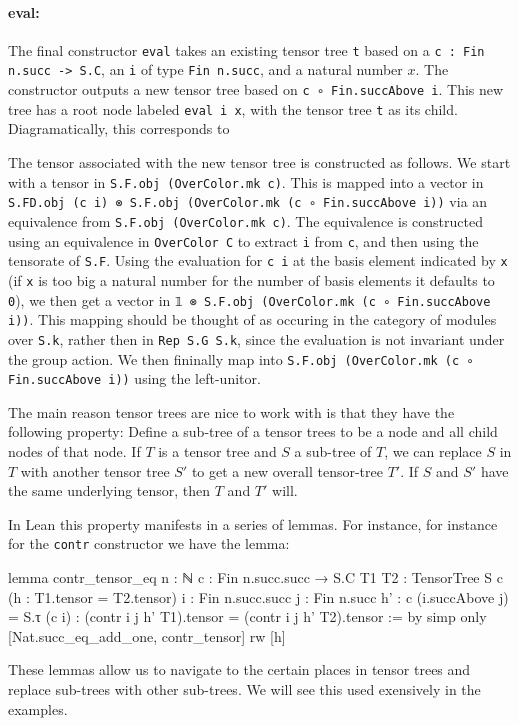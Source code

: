 \documentclass[a4paper, 11pt]{article}
\newcommand{\tensorTree}[1]{
\begin{center}
  \fcolorbox{mycolor}{white}{%
#1}
\end{center}
}
\begin{document}
\paragraph{eval:}
The final constructor \lstinline|eval| takes an existing tensor tree \lstinline|t| based on a \lstinline|c : Fin n.succ -> S.C|,
an \lstinline|i| of type \lstinline|Fin n.succ|, and a natural number $x$.  
The constructor outputs a new tensor tree based on \lstinline|c ∘ Fin.succAbove i|.
This new tree has a root node labeled \lstinline|eval i x|, with the tensor tree \lstinline|t| as its child.
Diagramatically, this corresponds to 
\tensorTree{
  \begin{tikzpicture}
    \node[draw=black] (A) at (0,0) {\lstinline|eval i x|};
    \node (B) at (0,-1) {\lstinline|t|};
    \draw[->] (A) -- (B);
  \end{tikzpicture} 
}
The tensor associated with the new tensor tree is constructed as follows.
We start with a tensor in \lstinline|S.F.obj (OverColor.mk c)|.
This is mapped into a vector in \lstinline|S.FD.obj (c i) ⊗ S.F.obj (OverColor.mk (c ∘ Fin.succAbove i))| via an equivalence from
\lstinline|S.F.obj (OverColor.mk c)|. The equivalence is constructed using an equivalence
in \lstinline|OverColor C| to extract \lstinline|i| from \lstinline|c|, and
then using the tensorate of \lstinline|S.F|.
Using the evaluation for \lstinline|c i| at the basis element indicated by \lstinline|x| (if \lstinline|x| is too big a natural number for the number of basis elements it defaults to \lstinline|0|), we then get a vector in
\lstinline|𝟙 ⊗ S.F.obj (OverColor.mk (c ∘ Fin.succAbove i))|.
This mapping should be thought of as occuring in the  category of modules over \lstinline|S.k|, rather then in 
\lstinline|Rep S.G S.k|, since the evaluation is not invariant under the group action.
We then fininally map  into \lstinline|S.F.obj (OverColor.mk (c ∘ Fin.succAbove i))| 
using the left-unitor.

The main reason tensor trees are nice to work with is that they have the following property: 
Define a sub-tree of a tensor trees 
to be a node and all child nodes of that node. 
If $T$ is a tensor tree and $S$ a sub-tree of $T$, we can replace $S$ in $T$ 
with another tensor tree $S'$
to get a new overall tensor-tree $T'$. If $S$ and $S'$ have the same underlying tensor, 
then $T$ and $T'$ will. 

In Lean this property manifests in a series of lemmas. For instance, for instance 
for the \lstinline|contr| constructor we have the lemma: 
\begin{code}
lemma contr_tensor_eq {n : ℕ} {c : Fin n.succ.succ → S.C} {T1 T2 : TensorTree S c}
    (h : T1.tensor = T2.tensor) {i : Fin n.succ.succ} {j : Fin n.succ}
    {h' : c (i.succAbove j) = S.τ (c i)} :
    (contr i j h' T1).tensor = (contr i j h' T2).tensor := by
  simp only [Nat.succ_eq_add_one, contr_tensor]
  rw [h]
\end{code}
These lemmas allow us to navigate to the certain places in tensor trees and replace 
sub-trees with other sub-trees. We will see this used exensively in the examples. 
\end{document}
